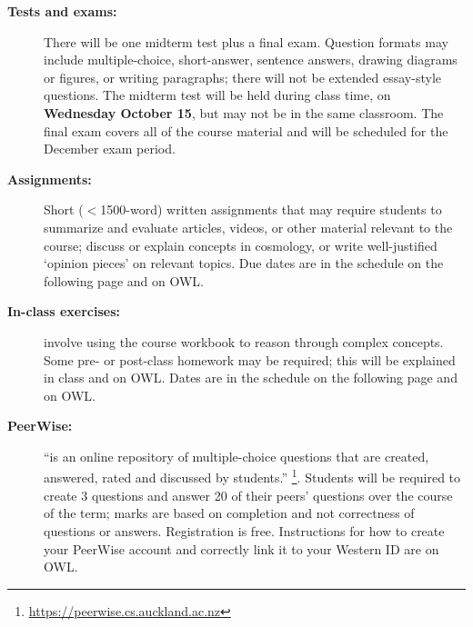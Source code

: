 \documentclass[12pt]{article}
\begin{document}
\begin{description}
\item[\bf Tests and exams:] There will be one midterm test plus a final exam. 
Question formats may include multiple-choice, short-answer, sentence answers, drawing diagrams or figures, or writing paragraphs;
there will not be extended essay-style questions. 
The midterm test will be held during class time, on {\bf  Wednesday October 15}, but may not be in the same classroom.
The final exam covers all of the course material and will be scheduled for the December exam period.

\item[\bf Assignments:] Short ($<$1500-word) written assignments that may require students to summarize and evaluate articles, videos, or
other material relevant to the course; discuss or explain concepts in cosmology, or write well-justified `opinion pieces' on relevant topics.
Due dates are in the schedule on the following page and on OWL.

\item[\bf In-class exercises:] involve using the course workbook to reason through complex concepts. Some pre- or post-class homework
may be required; this will be explained in class and on OWL. Dates are in the schedule on the following page and on OWL.

\item[\bf PeerWise:]  ``is an online repository of multiple-choice questions that are created, answered, rated and discussed by students.''%
\footnote{\url{https://peerwise.cs.auckland.ac.nz}}.  Students will be required to create 3 questions and answer
20 of their peers' questions over the course of the term; marks are based on completion and not correctness of questions or answers.
Registration is free. Instructions for how to create your PeerWise account and correctly link it to your Western ID are on OWL.

\end{description}

\clearpage
\end{document}
